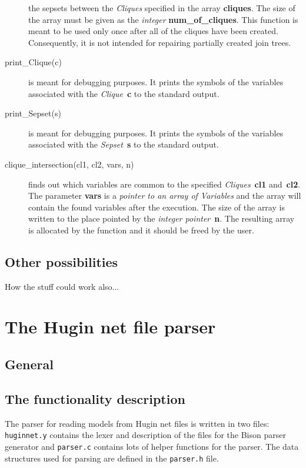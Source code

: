 \documentclass[12pt,a4paper]{report}
\begin{document}
\begin{description}
the sepsets between the {\it Cliques} specified in the array 
\textbf{cliques}. The size of the array must be given as the 
{\it integer} \textbf{num\_of\_cliques}. This function is meant to be
used only once after all of the cliques have been created. 
Consequently, it is not intended for repairing partially created 
join trees.
\item[print\_Clique(c)] is meant for debugging purposes. It prints the
symbols of the variables associated with the {\it Clique}~\textbf{c}
to the standard output.
\item[print\_Sepset(s)] is meant for debugging purposes. It prints the
symbols of the variables associated with the {\it Sepset}~\textbf{s}
to the standard output.
\item[clique\_intersection(cl1, cl2, vars, n)] finds out which
variables are common to the specified {\it Cliques}~\textbf{cl1}
and~\textbf{cl2}. The parameter \textbf{vars} is a {\it pointer to an
array of Variables} and the array will contain the found variables 
after the execution. The size of the array is written to the place 
pointed by the {\it integer pointer}~\textbf{n}. The resulting array
is allocated by the function and it should be freed by the user.

\end{description}


\subsection{Other possibilities}

How the stuff could work also...


\newpage
\section{The Hugin net file parser}
\subsection{General}


\subsection{The functionality description}
The parser for reading models from Hugin net files is written in two
files: \verb+huginnet.y+ contains the lexer and description of the
files for the Bison parser generator and \verb+parser.c+ contains lots
of helper functions for the parser. The data structures used for
parsing are defined in the \verb+parser.h+ file.
\end{document}
